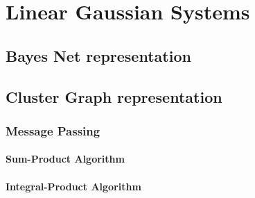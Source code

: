 \chapter{Linear Gaussian Systems}
\label{chapter:linear_gaussian}

\section{Bayes Net representation}
\label{section:bayes_net}



\section{Cluster Graph representation}
\label{section:cluster_graph}



\subsection{Message Passing}
\label{subsection:message_passing}


\subsubsection{Sum-Product Algorithm}
\label{subsubsection:sum-product}

\subsubsection{Integral-Product Algorithm}
\label{subsubsection:Integral-product}
